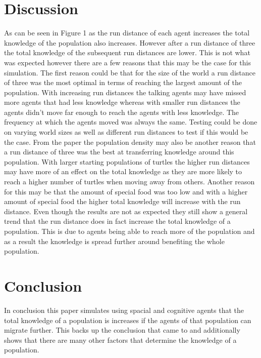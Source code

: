 \documentclass[12pt, letterpaper]{article}
\begin{document}
\begin{multicols}{2}
\section{Discussion}
As can be seen in Figure 1 as the run distance of each agent increases the total knowledge of the population also increases. However after a run distance of three the total knowledge of the subsequent run distances are lower. This is not what was expected however there are a few reasons that this may be the case for this simulation. The first reason could be that for the size of the world a run distance of three was the most optimal in terms of reaching the largest amount of the population. With increasing run distances the talking agents may have missed more agents that had less knowledge whereas with smaller run distances the agents didn't move far enough to reach the agents with less knowledge. The frequency at which the agents moved was always the same. Testing could be done on varying world sizes as well as different run distances to test if this would be the case. From the \cite{Powell} paper the population density may also be another reason that a run distance of three was the best at transferring knowledge around this population. With larger starting populations of turtles the higher run distances may have more of an effect on the total knowledge as they are more likely to reach a higher number of turtles when moving away from others. Another reason for this may be that the amount of special food was too low and with a higher amount of special food the higher total knowledge will increase with the run distance. Even though the results are not as expected they still show a general trend that the run distance does in fact increase the total knowledge of a population. This is due to agents being able to reach more of the population and as a result the knowledge is spread further around benefiting the whole population. 
\section{Conclusion}
In conclusion this paper simulates using spacial and cognitive agents that the total knowledge of a population is increases if the agents of that population can migrate further. This backs up the conclusion that \cite{Powell} came to and additionally shows that there are many other factors that determine the knowledge of a population. 
\end{multicols}
\newpage


\end{document}
